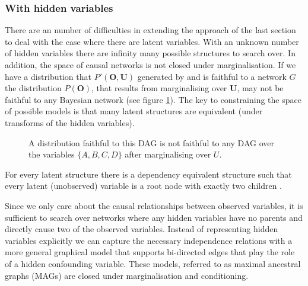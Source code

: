 \subsubsection{With hidden variables}
There are an number of difficulties in extending the approach of the last section to deal with the case where there are latent variables. With an unknown number of hidden variables there are infinity many possible structures to search over. In addition, the space of causal networks is not closed under marginalisation. If we have a distribution that $P'(\boldsymbol{O},\boldsymbol{U})$ generated by and is faithful to a network $G$ the distribution $P(\boldsymbol{O})$, that results from marginalising over $\boldsymbol{U}$, may not be faithful to any Bayesian network (see figure \ref{fig:DAGSnotclosed}). The key to constraining the space of possible models is that many latent structures are equivalent (under transforms of the hidden variables).

\begin{figure}
\centering
\caption{A distribution faithful to this DAG is not faithful to any DAG over the variables $\{A,B,C,D\}$ after marginalising over $U$. }
\label{fig:DAGSnotclosed}
\end{figure}
 
\begin{theorem}
\citet{Verma1993} For every latent structure there is a dependency equivalent structure such that every latent (unobserved) variable is a root node with exactly two children .
\end{theorem}

Since we only care about the causal relationships between observed variables, it is sufficient to search over networks where any hidden variables have no parents and directly cause two of the observed variables. Instead of representing hidden variables explicitly we can capture the necessary independence relations with a more general graphical model that supports bi-directed edges that play the role of a hidden confounding variable. These models, referred to as maximal ancestral graphs (MAGs) are closed under marginalisation and conditioning. 

